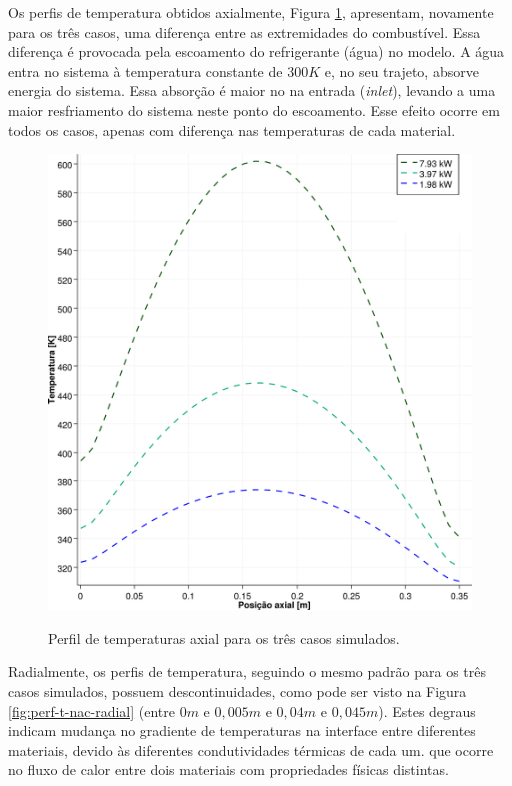 Os perfis de temperatura obtidos axialmente, Figura \ref{fig:perf-t-nac-axial},
apresentam, novamente para os três casos, uma diferença entre as extremidades
do combustível. Essa diferença é provocada pela escoamento do refrigerante (água) no
modelo. A água entra no sistema à temperatura constante de $300 K$ e, no seu trajeto,
absorve energia do sistema. Essa absorção é maior no na entrada (\textit{inlet}),
levando a uma maior resfriamento do sistema neste ponto do escoamento. Esse efeito
ocorre em todos os casos, apenas com diferença nas temperaturas de cada material.

\begin{figure}[htb]
  \caption{Perfil de temperaturas axial para os três casos simulados.}
  \centering\includegraphics[scale=0.5]{figuras/T_z_NC_square_port.png}
  \label{fig:perf-t-nac-axial}
\end{figure}

Radialmente, os perfis de temperatura, seguindo o mesmo padrão para os três casos simulados,
possuem descontinuidades, como pode ser visto na Figura \ref{fig:perf-t-nac-radial} (entre
$0 m$ e $0,005 m$ e $0,04 m$ e $0,045 m$). Estes degraus indicam mudança no gradiente de temperaturas na
interface entre diferentes materiais, devido às diferentes condutividades térmicas de cada um.
que ocorre no fluxo de calor entre dois materiais com propriedades físicas distintas.

